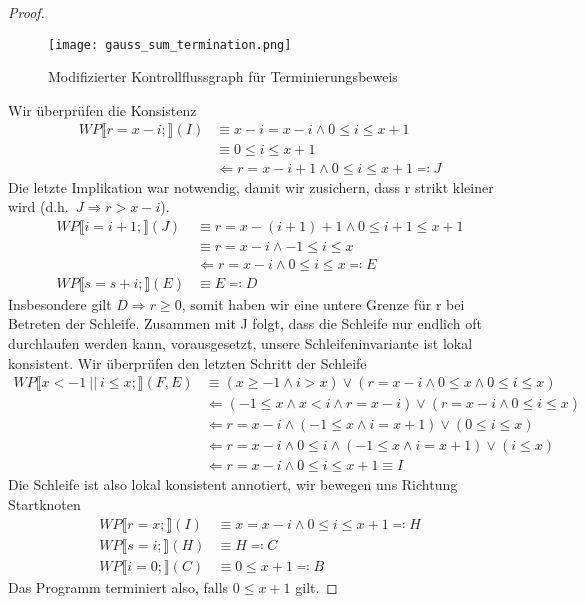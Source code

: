 \documentclass[hidelinks]{article}
\theoremstyle{plain}
\theoremstyle{definition}
\theoremstyle{rem}
\begin{document}
\begin{sloppypar}
\begin{proof}
\begin{figure}[H]
	\texttt{[image: gauss\_sum\_termination.png]}
	\centering
	\caption{Modifizierter Kontrollflussgraph für Terminierungsbeweis}
\end{figure}
Wir überprüfen die Konsistenz
\begin{align*}
WP\llbracket r=x-i;\rrbracket(I)&\equiv x-i=x-i\wedge 0\le i\le x+1\\
&\equiv 0\le i \le x+1\\
&\Leftarrow r=x-i+1 \wedge 0\le i \le x+1\eqqcolon J
\end{align*}
Die letzte Implikation war notwendig, damit wir zusichern, dass r strikt kleiner wird (d.h.\ $J\Rightarrow r>x-i$).
\begin{align*}
WP\llbracket i=i+1;\rrbracket(J)&\equiv r=x-(i+1)+1 \wedge 0\le i+1 \le x+1\\
&\equiv r=x-i \wedge -1\le i \le x\\
&\Leftarrow r= x-i \wedge 0\le i \le x\eqqcolon E\\
WP\llbracket s=s+i;\rrbracket(E)&\equiv E\eqqcolon D
\end{align*}
Insbesondere gilt $D\Rightarrow r\ge 0$, somit haben wir eine untere Grenze für r bei Betreten der Schleife. Zusammen mit J folgt, dass die Schleife nur endlich oft durchlaufen werden kann, vorausgesetzt, unsere Schleifeninvariante ist lokal konsistent. Wir überprüfen den letzten Schritt der Schleife
\begin{align*}
WP\llbracket x<-1\ ||\ i\le x;\rrbracket(F,E)&\equiv (x\ge -1 \wedge i>x)\vee(r= x-i \wedge 0\le x \wedge 0\le i \le x)\\
&\Leftarrow (-1\le x \wedge x<i \wedge r=x-i)\vee(r=x-i \wedge 0\le i \le x)\\
&\Leftarrow r=x-i \wedge (-1\le x \wedge i=x+1)\vee(0\le i \le x)\\
&\Leftarrow r=x-i \wedge 0\le i \wedge (-1\le x \wedge i=x+1)\vee(i \le x)\\
&\Leftarrow r=x-i \wedge 0\le i \le x+1\equiv I
\end{align*}
Die Schleife ist also lokal konsistent annotiert, wir bewegen uns Richtung Startknoten
\begin{align*}
WP\llbracket r=x;\rrbracket(I)&\equiv x=x-i \wedge 0\le i \le x+1\eqqcolon H\\
WP\llbracket s=i;\rrbracket(H)&\equiv H\eqqcolon C\\
WP\llbracket i=0;\rrbracket(C)&\equiv 0\le x+1\eqqcolon B
\end{align*}
Das Programm terminiert also, falls $0\le x+1$ gilt.
\end{proof}

\end{sloppypar}
\end{document}
